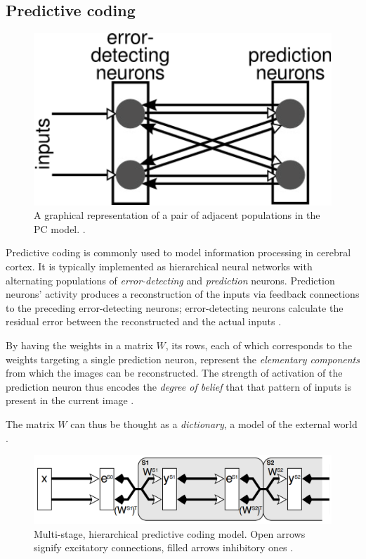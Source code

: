 \documentclass[11pt,a4paper]{report}
\begin{document}
			\subsection{Predictive coding}
				\begin{figure}[h]
					\centering
					\includegraphics[scale=0.5]{prediction}
					\caption[Representation of pair of adjacent populations in PC model.]{A graphical representation of a pair of adjacent populations in the PC model. \cite{spratling2014predictive}.}
					\label{fig:predictive}
				\end{figure}
				
				Predictive coding is commonly used to model information processing in cerebral cortex. It is typically implemented as hierarchical neural networks with alternating populations of \emph{error-detecting} and \emph{prediction} neurons. Prediction neurons' activity produces a reconstruction of the inputs via feedback connections to the preceding error-detecting neurons; error-detecting neurons calculate the residual error between the reconstructed and the actual inputs \cite{spratling2014predictive}.
				
				By having the weights in a matrix $W$, its rows, each of which corresponds to the weights targeting a single prediction neuron, represent the \emph{elementary components} from which the images can be reconstructed. The strength of activation of the prediction neuron thus encodes the \emph{degree of belief} that that pattern of inputs is present in the current image \cite{spratling2014predictive}.
				
				The matrix $W$ can thus be thought as a \emph{dictionary}, a model of the external world \cite{spratling2012unsupervised,spratling2014predictive}.

				\begin{figure}[h]
					\centering
					\includegraphics[width=\textwidth]{pc}
					\caption[Multi-stage, hierarchical predictive coding model.]{Multi-stage, hierarchical predictive coding model. Open arrows signify excitatory connections, filled arrows inhibitory ones \cite{spratling2008reconciling}.}
					\label{fig:pc}
				\end{figure}
\end{document}
